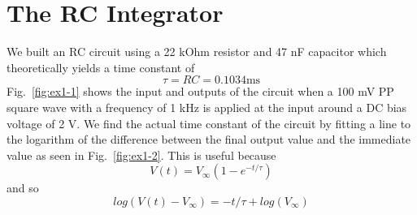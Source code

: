 \section{The RC Integrator}
We built an RC circuit using a 22 kOhm resistor and 47 nF capacitor which theoretically yields a time constant of
\begin{equation*}
    \tau = RC = 0.1034 \mathrm{ms}
\end{equation*}
Fig.~\ref{fig:ex1-1} shows the input and outputs of the circuit when a 100 mV PP square wave with a frequency of 1 kHz is applied at the input around
a DC bias voltage of 2 V. We find the actual time constant of the circuit by fitting a line to the logarithm of the difference between the 
final output value and the immediate value as seen in Fig.~\ref{fig:ex1-2}. This is useful because 
\begin{equation*}
V(t)=V_\infty(1-e^{-t/\tau})
\end{equation*}
and so
\begin{equation*}
log(V(t)-V_\infty) = -t/\tau + log(V_\infty)
\end{equation*}

